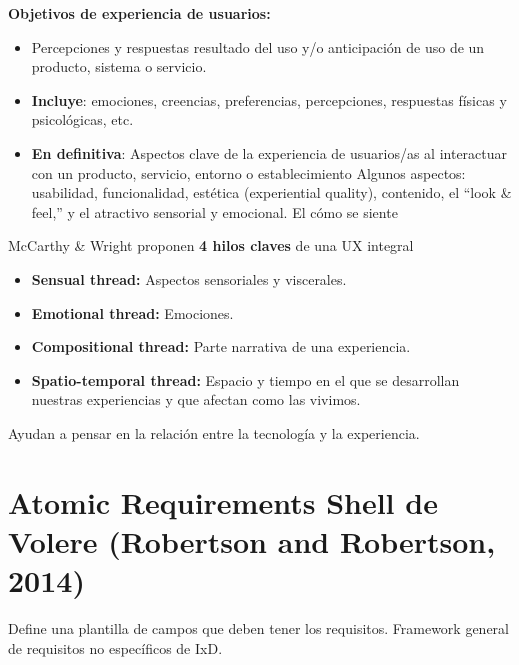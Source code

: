 \documentclass[12pt, twoside, openright]{report} %
\begin{document}
\textbf{Objetivos de experiencia de usuarios:}

\begin{itemize}
	\item Percepciones y respuestas resultado del uso y/o anticipación de uso de
	      un producto, sistema o servicio.
	\item \textbf{Incluye}: emociones, creencias, preferencias, percepciones, respuestas
	      físicas y psicológicas, etc.
	\item \textbf{En definitiva}: Aspectos clave de la experiencia de usuarios/as al
	      interactuar con un producto, servicio, entorno o establecimiento
	      Algunos aspectos: usabilidad, funcionalidad, estética (experiential
	      quality), contenido, el ``look \& feel,'' y el atractivo sensorial y
	      emocional. El cómo se siente
\end{itemize}

McCarthy \& Wright proponen \textbf{4 hilos claves} de una UX integral

\begin{itemize}
	\item \textbf{Sensual thread:} Aspectos sensoriales y viscerales.
	\item \textbf{Emotional thread:} Emociones.
	\item \textbf{Compositional thread:} Parte narrativa de una experiencia.
	\item \textbf{Spatio-temporal thread:} Espacio y tiempo en el que se desarrollan
	      nuestras experiencias y que afectan como las vivimos.
\end{itemize}

Ayudan a pensar en la relación entre la tecnología y la experiencia.

\newpage

\section{Atomic Requirements Shell de Volere (Robertson and
  Robertson, 2014)}

Define una plantilla de campos que deben tener los requisitos. Framework
general de requisitos no específicos de IxD.
\end{document}
